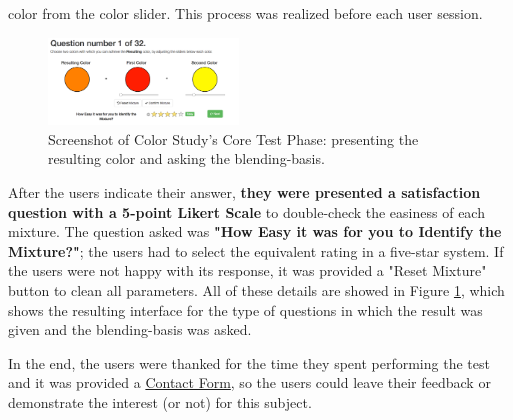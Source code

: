 color from the color slider. This process was realized before each user session. \par
%
\begin{figure}
	\centering
  \includegraphics[width=0.45\textwidth]{images/implementation/screen_core.png}
  \caption[Screenshot of Color Study's Core Test Phase: present the result and ask the blending-basis.]{Screenshot of
	Color Study's Core Test Phase: presenting the resulting color and asking the blending-basis.}
  \label{fig:screen_core}
\end{figure} \par
%
After the users indicate their answer, \textbf{they were presented a satisfaction question with a 5-point Likert Scale} to double-check the easiness
of each mixture. The question asked was \textbf{"How Easy it was for you to Identify the Mixture?"}; the users had to select the equivalent rating in a
five-star system. If the users were not happy with its response, it was provided a "Reset Mixture" button to clean all parameters. All of these details are
showed in Figure \ref{fig:screen_core}, which shows the resulting interface for the type of questions in which the result was given and the blending-basis
was asked. \par
%
In the end, the users were thanked for the time they spent performing the test and it was provided a \ul{Contact Form}, so the users could leave their feedback or
demonstrate the interest (or not) for this subject. \par
%
